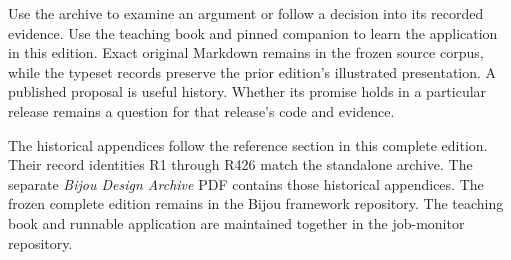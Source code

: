 Use the archive to examine an argument or follow a decision into its recorded evidence. Use the teaching book and pinned companion to learn the application in this edition. Exact original Markdown remains in the frozen source corpus, while the typeset records preserve the prior edition's illustrated presentation. A published proposal is useful history. Whether its promise holds in a particular release remains a question for that release's code and evidence.

\ifBookArchive
The historical appendices follow the reference section in this complete edition. Their record identities R1 through R426 match the standalone archive.
\else
The separate \textit{Bijou Design Archive} PDF contains those historical appendices. The frozen complete edition remains in the Bijou framework repository. The teaching book and runnable application are maintained together in the job-monitor repository.
\fi
